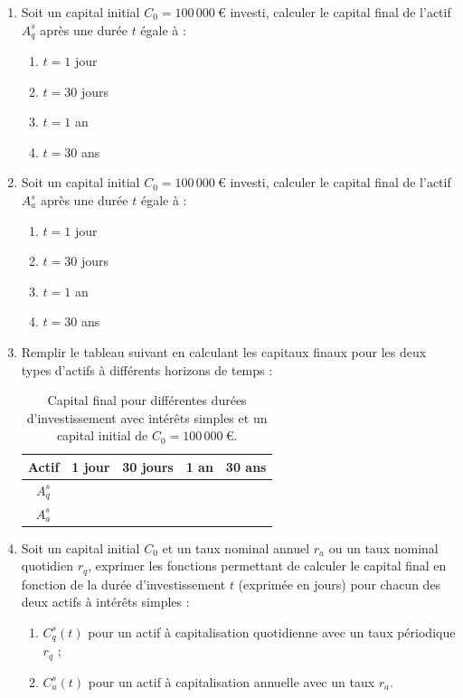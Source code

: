 \documentclass{article}
\begin{document}
\begin{enumerate}[label=\textbf{Q1.\arabic*}]
    \item Soit un capital initial \( C_0 = 100\,000\ \text{€} \) investi, calculer le capital final de l'actif \( A_q^s \) après une durée \( t \) égale à :
    \begin{enumerate}[label=(\alph*)]
        \item \( t = 1 \) jour
        \item \( t = 30 \) jours
        \item \( t = 1 \) an
        \item \( t = 30 \) ans
    \end{enumerate}

    \item Soit un capital initial \( C_0 = 100\,000\ \text{€} \) investi, calculer le capital final de l'actif \( A_a^s \) après une durée \( t \) égale à :
    \begin{enumerate}[label=(\alph*)]
        \item \( t = 1 \) jour
        \item \( t = 30 \) jours
        \item \( t = 1 \) an
        \item \( t = 30 \) ans
    \end{enumerate}
    
    \item Remplir le tableau suivant en calculant les capitaux finaux pour les deux types d'actifs à différents horizons de temps :\\
    \begin{table}[h!]
        \centering
        \begin{tabular}{|c|c|c|c|c|}
        \hline
        \textbf{Actif} & \textbf{1 jour} & \textbf{30 jours} & \textbf{1 an} & \textbf{30 ans} \\
        \hline
        \( A_q^s \) & & & & \\
        \hline
        \( A_a^s \) & & & & \\
        \hline
        \end{tabular}
        \caption{Capital final pour différentes durées d'investissement avec intérêts simples et un capital initial de \( C_0 = 100\,000\ \text{€} \).}
        \label{tab:simple_interest_results}
    \end{table}

    \item Soit un capital initial \( C_0 \) et un taux nominal annuel \( r_a \) ou un taux nominal quotidien \( r_q \), exprimer les fonctions permettant de calculer le capital final en fonction de la durée d'investissement \( t \) (exprimée en jours) pour chacun des deux actifs à intérêts simples :
    \begin{enumerate}[label=(\alph*)]
        \item \( C^s_q(t) \) pour un actif à capitalisation quotidienne avec un taux périodique \( r_q \) ;
        \item \( C^s_a(t) \) pour un actif à capitalisation annuelle avec un taux \( r_a \).
    \end{enumerate}


\end{enumerate}
\end{document}
